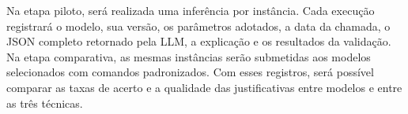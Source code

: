 Na etapa piloto, será realizada uma inferência por instância. Cada execução registrará o modelo, sua versão, os parâmetros adotados, a data da chamada, o JSON completo retornado pela LLM, a explicação e os resultados da validação. Na etapa comparativa, as mesmas instâncias serão submetidas aos modelos selecionados com comandos padronizados. Com esses registros, será possível comparar as taxas de acerto e a qualidade das justificativas entre modelos e entre as três técnicas.
